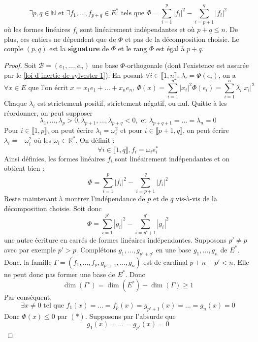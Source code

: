   \begin{theorem}
    \[ \exists p, q \in \mathbb{N} \text{ et } \exists f_1, \dots, f_{p+q} \in E^* \text{ tels que } \Phi = \sum_{i=1}^p |f_i|^2 - \sum_{i=p+1}^q |f_i|^2 \]
    où les formes linéaires $f_i$ sont linéairement indépendantes et où $p + q \leq n$. De plus, ces entiers ne dépendent que de $\Phi$ et pas de la décomposition choisie.
    \newpar
    Le couple $(p,q)$ est la \textbf{signature} de $\Phi$ et le rang $\Phi$ est égal à $p+q$.
  \end{theorem}

  \begin{proof}
    Soit $\mathcal{B} = (e_1, \dots, e_n)$ une base $\Phi$-orthogonale (dont l'existence est assurée par le \cref{loi-d-inertie-de-sylvester-1}). En posant $\forall i \in \llbracket 1, n \rrbracket$, $\lambda_i = \Phi(e_i)$, on a
    \[ \forall x \in E \text{ que l'on écrit } x = x_1 e_1 + \dots + x_n e_n, \, \Phi(x) = \sum_{i=1}^n |x_i|^2 \Phi(e_i) = \sum_{i=1}^n \lambda_i |x_i|^2 \]
    Chaque $\lambda_i$ est strictement positif, strictement négatif, ou nul. Quitte à les réordonner, on peut supposer
    \[ \lambda_1, \dots, \lambda_p > 0, \lambda_{p+1}, \dots, \lambda_{p+q} < 0, \text{ et } \lambda_{p+q+1} = \dots = \lambda_n = 0 \]
    Pour $i \in \llbracket 1, p \rrbracket$, on peut écrire $\lambda_i = \omega_i^2$ et pour $i \in \llbracket p+1, q \rrbracket$, on peut écrire $\lambda_i = -\omega_i^2$ où les $\omega_i \in \mathbb{R}^*$. On définit :
    \[ \forall i \in \llbracket 1, q \rrbracket, f_i = \omega_i e_i^* \]
    Ainsi définies, les formes linéaires $f_i$ sont linéairement indépendantes et on obtient bien :
    \[ \Phi = \sum_{i=1}^p |f_i|^2 - \sum_{i=p+1}^q |f_i|^2 \tag{$*$} \]
    Reste maintenant à montrer l'indépendance de $p$ et de $q$ vis-à-vis de la décomposition choisie. Soit donc
    \[ \Phi = \sum_{i=1}^{p'} |g_i|^2 - \sum_{i=p'+1}^{q'} |g_i|^2 \tag{$**$} \]
    une autre écriture en carrés de formes linéaires indépendantes. Supposons $p' \neq p$ avec par exemple $p' > p$. Complétons $g_1, \dots, g_{p'+q'}$ en une base $g_1, \dots, g_n$ de $E^*$. Donc, la famille $\Gamma = (f_1, \dots, f_p, g_{p'+1}, \dots, g_n)$ est de cardinal $p + n - p' < n$. Elle ne peut donc pas former une base de $E^*$. Donc
    \[ \dim(\Gamma^\circ) = \dim(E^*) - \dim(\Gamma) \geq 1 \]
    Par conséquent,
    \[ \exists x \neq 0 \text{ tel que } f_1(x) = \dots = f_p(x) = g_{p'+1}(x) = \dots = g_n(x) = 0 \]
    Donc $\Phi(x) \leq 0$ par $(*)$. Supposons par l'absurde que
    \[ g_1(x) = \dots = g_{p'}(x) = 0 \]

\end{proof}
